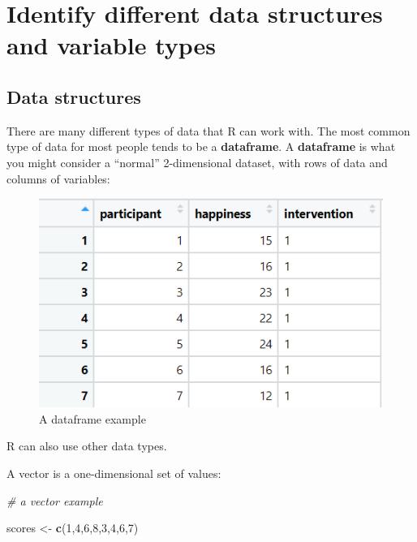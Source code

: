 \documentclass[
]{book}
\newenvironment{Shaded}{\begin{snugshade}}{\end{snugshade}}
\newcommand{\CommentTok}[1]{\textcolor[rgb]{0.56,0.35,0.01}{\textit{#1}}}
\newcommand{\DecValTok}[1]{\textcolor[rgb]{0.00,0.00,0.81}{#1}}
\newcommand{\KeywordTok}[1]{\textcolor[rgb]{0.13,0.29,0.53}{\textbf{#1}}}
\newcommand{\NormalTok}[1]{#1}
\newcommand{\StringTok}[1]{\textcolor[rgb]{0.31,0.60,0.02}{#1}}
\begin{document}
\hypertarget{identify-different-data-structures-and-variable-types}{%
\section{Identify different data structures and variable types}\label{identify-different-data-structures-and-variable-types}}

\hypertarget{data-structures}{%
\subsection{Data structures}\label{data-structures}}

There are many different types of data that R can work with. The most common type of data for most people tends to be a \textbf{dataframe}. A \textbf{dataframe} is what you might consider a ``normal'' 2-dimensional dataset, with rows of data and columns of variables:

\begin{figure}
\centering
\includegraphics{images/dataframe.png}
\caption{A dataframe example}
\end{figure}

R can also use other data types.

A vector is a one-dimensional set of values:

\begin{Shaded}
\begin{Highlighting}[]
\CommentTok{# a vector example}

\NormalTok{scores <-}\StringTok{ }\KeywordTok{c}\NormalTok{(}\DecValTok{1}\NormalTok{,}\DecValTok{4}\NormalTok{,}\DecValTok{6}\NormalTok{,}\DecValTok{8}\NormalTok{,}\DecValTok{3}\NormalTok{,}\DecValTok{4}\NormalTok{,}\DecValTok{6}\NormalTok{,}\DecValTok{7}\NormalTok{)}
\end{Highlighting}
\end{Shaded}
\end{document}
